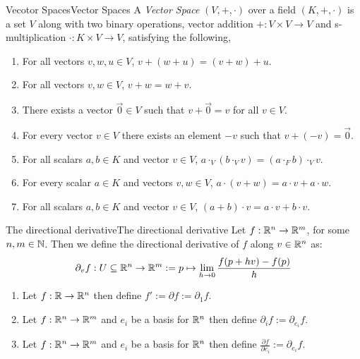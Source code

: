 \documentclass{article}
\begin{document}
\begin{definition}{Vecotor Spaces}{Vector Spaces}
    A \emph{Vector Space} $\left(V, +, \cdot\right)$ over a field $\left(K, +, \cdot\right)$ is a set $V$ along with two binary operations,
    vector addition $+: V \times V \to V$
    and s-multiplication $\cdot: K \times V \to V$,
    satisfying the following,

    \begin{enumerate}[label=(\roman*)]
        \item  For all vectors $v, w, u \in V$, $v + (w + u) = (v + w) + u$.
        \item  For all vectors $v, w \in V$, $v + w = w + v$.
        \item  There exists a vector $\vec{0} \in V$ such that $v + \vec{0} = v$ for all $v \in V$.
        \item  For every vector $v \in V$ there exists an element $-v$ such that $v + (-v) = \vec{0}$.
        \item  For all scalars $a, b \in K$ and vector $v \in V$, $a \cdot_V (b \cdot_V v) = (a \cdot_F b) \cdot_V v$.
        \item  For every scalar $a \in K$ and vectors $v, w \in V$, $a \cdot (v + w) = a \cdot v + a \cdot w$.
        \item  For all scalars $a, b \in K$ and vector $v\in V$, $(a + b) \cdot v = a \cdot v + b \cdot v$.
    \end{enumerate}
\end{definition}

\begin{definition}{The directional derivative}{The directional derivative}
    Let $f : \mathbb{R}^n \to \mathbb{R}^m$, for some $n, m \in \mathbb{N}$.
    Then we define the directional derivative of $f$ along $v \in \mathbb{R}^n$ as:
    $$\partial_v f : U \subseteq \mathbb{R}^n \to \mathbb{R}^m := p \mapsto \lim_{h \to 0} \frac{f(p + hv) - f(p)}{h}$$
\end{definition}

\begin{notation}{}{}
    \begin{enumerate}[label=(\roman*)]
        \item Let $f: \mathbb{R} \to \mathbb{R}^n$ then define $f' := \partial f := \partial_1 f$.
        \item Let $f: \mathbb{R}^n \to \mathbb{R}^m$ and $e_i$ be a basis for $\mathbb{R}^n$ then define $\partial_i f := \partial_{e_i} f$.
        \item Let $f: \mathbb{R}^n \to \mathbb{R}^m$ and $e_i$ be a basis for $\mathbb{R}^n$ then define $\frac{\partial f}{\partial e_i} := \partial_{e_i} f$.
    \end{enumerate}
\end{notation}{}{}
\end{document}
